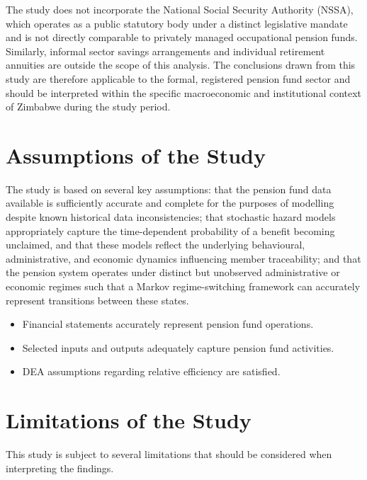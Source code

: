 \documentclass[12pt,a4paper]{article}
\begin{document}
The study does not incorporate the National Social Security Authority (NSSA), which operates as a public statutory body under a distinct legislative mandate and is not directly comparable to privately managed occupational pension funds. Similarly, informal sector savings arrangements and individual retirement annuities are outside the scope of this analysis. The conclusions drawn from this study are therefore applicable to the formal, registered pension fund sector and should be interpreted within the specific macroeconomic and institutional context of Zimbabwe during the study period.

\section{Assumptions of the Study}

The study is based on several key assumptions: that the pension fund data available is sufficiently accurate and complete for the purposes of modelling despite known historical data inconsistencies; that stochastic hazard models appropriately capture the time-dependent probability of a benefit becoming unclaimed, and that these models reflect the underlying behavioural, administrative, and economic dynamics influencing member traceability; and that the pension system operates under distinct but unobserved administrative or economic regimes such that a Markov regime-switching framework can accurately represent transitions between these states.

\begin{itemize}[noitemsep]
    \item Financial statements accurately represent pension fund operations.
    \item Selected inputs and outputs adequately capture pension fund activities.
    \item DEA assumptions regarding relative efficiency are satisfied.
\end{itemize}

\section{Limitations of the Study}

This study is subject to several limitations that should be considered when interpreting the findings.
\end{document}
